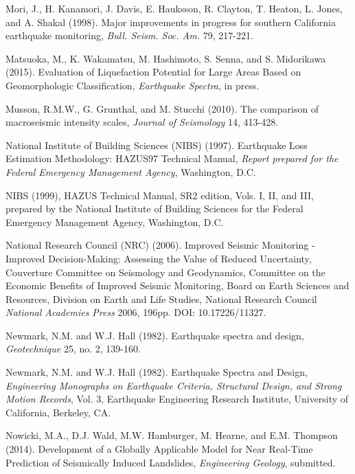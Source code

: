 \documentclass[letterpaper,10pt,english]{sphinxmanual}
\begin{document}
Mori, J., H. Kanamori, J. Davis, E. Hauksson, R. Clayton, T. Heaton, L. Jones, and A. Shakal (1998).
Major improvements in progress for southern California earthquake monitoring, \emph{Bull. Seism. Soc. Am.} 79, 217-221.

\label{references:matsuoka2015}
Matsuoka, M., K. Wakamatsu, M. Hashimoto, S. Senna, and S. Midorikawa (2015). Evaluation of
Liquefaction Potential for Large Areas Based on Geomorphologic Classification, \emph{Earthquake Spectra},
in press.

\label{references:musson2010}
Musson, R.M.W., G. Grunthal, and M. Stucchi (2010). The comparison of macroseismic intensity scales,
\emph{Journal of Seismology} 14, 413-428.

\label{references:nibs1997}
National Institute of Building Sciences (NIBS) (1997). Earthquake Loss Estimation Methodology:
HAZUS97 Technical Manual, \emph{Report prepared for the Federal Emergency Management Agency},
Washington, D.C.

NIBS (1999), HAZUS Technical Manual, SR2 edition, Vols. I, II, and III, prepared by the National
Institute of Building Sciences for the Federal Emergency Management Agency, Washington, D.C.

\label{references:nrc2006}
National Research Council (NRC) (2006). Improved Seismic Monitoring -
Improved Decision-Making: Assessing the Value of Reduced Uncertainty,
Couverture Committee on Seismology and Geodynamics, Committee on the
Economic Benefits of Improved Seismic Monitoring, Board on Earth
Sciences and Resources, Division on Earth and Life Studies, National Research Council
\emph{National Academies Press} 2006, 196pp. DOI: 10.17226/11327.

\label{references:newmark1982}
Newmark, N.M. and W.J. Hall (1982). Earthquake spectra and design, \emph{Geotechnique} 25, no. 2, 139-160.

Newmark, N.M. and W.J. Hall (1982). Earthquake Spectra and Design, \emph{Engineering Monographs on
Earthquake Criteria, Structural Design, and Strong Motion Records}, Vol. 3, Earthquake Engineering
Research Institute, University of California, Berkeley, CA.

\label{references:nowicki2014}
Nowicki, M.A., D.J. Wald, M.W. Hamburger, M. Hearne, and E.M. Thompson (2014). Development of
a Globally Applicable Model for Near Real-Time Prediction of Seismically Induced Landslides,
\emph{Engineering Geology}, submitted.
\end{document}
